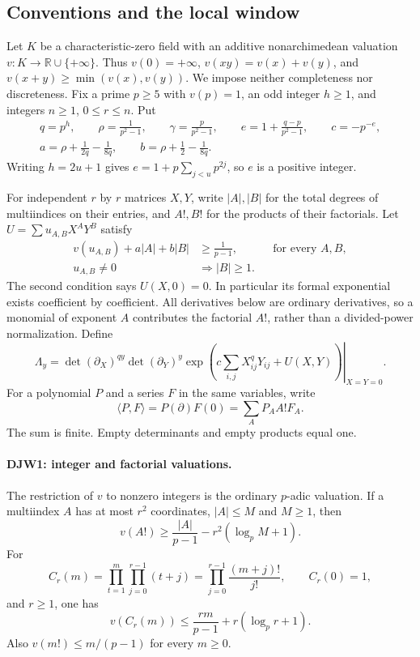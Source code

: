 \documentclass[11pt,a4paper]{article}
\numberwithin{equation}{section}
\theoremstyle{remark}\newtheorem{remark}[theorem]{Remark}
\begin{document}
\subsection{Conventions and the local window}

Let $K$ be a characteristic-zero field with an additive
nonarchimedean valuation
$v:K\longrightarrow\mathbb R\cup\{+\infty\}$.
Thus $v(0)=+\infty$, $v(xy)=v(x)+v(y)$, and
$v(x+y)\ge\min(v(x),v(y))$.  We impose neither completeness nor
discreteness.  Fix a prime $p\ge5$ with $v(p)=1$, an odd integer
$h\ge1$, and integers $n\ge1$, $0\le r\le n$.  Put
\begin{gather}
 q=p^h,\qquad \rho=\frac1{p^2-1},\qquad
 \gamma=\frac p{p^2-1},\qquad
 e=1+\frac{q-p}{p^2-1},\qquad c=-p^{-e},\label{djw:parameters}\\
 a=\rho+\frac1{2q}-\frac1{8q},\qquad
 b=\rho+\frac12-\frac1{8q}.
 \label{djw:weights}
\end{gather}
Writing $h=2u+1$ gives
$e=1+p\sum_{j<u}p^{2j}$, so $e$ is a positive integer.

For independent $r$ by $r$ matrices $X,Y$, write $|A|,|B|$ for
the total degrees of multiindices on their entries, and $A!,B!$ for
the products of their factorials.  Let
$U=\sum u_{A,B}X^AY^B$ satisfy
\begin{align}
 v(u_{A,B})+a|A|+b|B|&\ge\frac1{p-1},
       &&\text{for every }A,B,\label{djw:hm1}\\
 u_{A,B}\ne0&\Longrightarrow |B|\ge1.
       \label{djw:hm2}
\end{align}
The second condition says $U(X,0)=0$.  In particular its formal
exponential exists coefficient by coefficient.  All derivatives below
are ordinary derivatives, so a monomial of exponent $A$ contributes
the factorial $A!$, rather than a divided-power normalization.
Define
\begin{equation}
 \Lambda_y=
 \left.\det(\partial_X)^{qy}\det(\partial_Y)^y
 \exp\left(c\sum_{i,j}X_{ij}^{q}Y_{ij}+U(X,Y)\right)
 \right|_{X=Y=0}.
 \label{djw:lambda}
\end{equation}
For a polynomial $P$ and a series $F$ in the same variables, write
\[
 \langle P,F\rangle=P(\partial)F(0)
       =\sum_A P_A A!F_A.
\]
The sum is finite.  Empty determinants and empty products equal one.

\paragraph{DJW1: integer and factorial valuations.}
\label{claim:DJW1}
The restriction of $v$ to nonzero integers is the ordinary
$p$-adic valuation.  If a multiindex $A$ has at most $r^2$ coordinates,
$|A|\le M$ and $M\ge1$, then
\begin{equation}
 v(A!)\ge\frac{|A|}{p-1}-r^2(\log_p M+1).
 \label{djw:multifactorial}
\end{equation}
For
\[
 C_r(m)=\prod_{t=1}^{m}\prod_{j=0}^{r-1}(t+j)
       =\prod_{j=0}^{r-1}\frac{(m+j)!}{j!},\qquad C_r(0)=1,
\]
and $r\ge1$, one has
\begin{equation}
 v(C_r(m))\le\frac{rm}{p-1}+r(\log_p r+1).
 \label{djw:capacity}
\end{equation}
Also $v(m!)\le m/(p-1)$ for every $m\ge0$.
\end{document}
